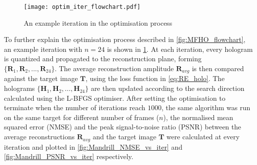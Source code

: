 	\begin{figure}[H]
		\centering
		\texttt{[image: optim\_iter\_flowchart.pdf]}
		\caption{An example iteration in the optimisation process}
		\label{fig:optim_iter_flowchart}
	\end{figure}

	To further explain the optimisation process described in \cref{fig:MFHO_flowchart}, an example iteration with $n=24$ is shown in \cref{fig:optim_iter_flowchart}. At each iteration, every hologram is quantized and propagated to the reconstruction plane, forming $\{\textbf{R}_1, \textbf{R}_2, ..., \textbf{R}_{24}\}$. The average reconstruction amplitude $\textbf{R}_{avg}$ is then compared against the target image $\textbf{T}$, using the loss function in \cref{eq:RE_holo}. The holograms $\{\textbf{H}_1, \textbf{H}_2, ..., \textbf{H}_{24}\}$ are then updated according to the search direction calculated using the L-BFGS optimiser. After setting the optimisation to terminate when the number of iterations reach $1000$, the same algorithm was run on the same target for different number of frames ($n$), the normalised mean squared error (NMSE) and the peak signal-to-noise ratio (PSNR) between the average reconstructions $\textbf{R}_{avg}$ and the target image $\textbf{T}$ were calculated at every iteration and plotted in \cref{fig:Mandrill_NMSE_vs_iter} and \cref{fig:Mandrill_PSNR_vs_iter} respectively.

